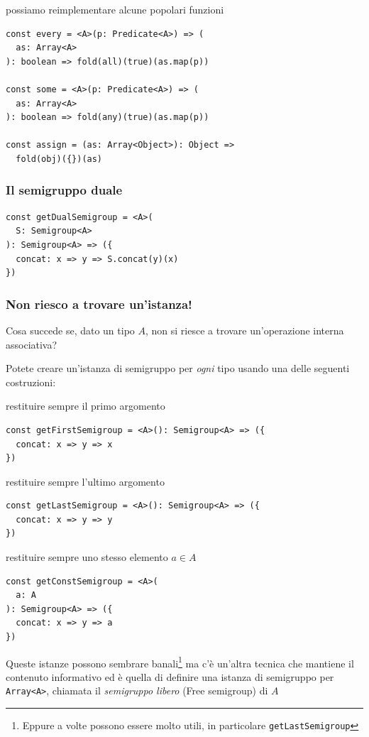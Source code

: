 \documentclass[12pt]{article}
\begin{document}
possiamo reimplementare alcune popolari funzioni

\begin{verbatim}
const every = <A>(p: Predicate<A>) => (
  as: Array<A>
): boolean => fold(all)(true)(as.map(p))

const some = <A>(p: Predicate<A>) => (
  as: Array<A>
): boolean => fold(any)(true)(as.map(p))

const assign = (as: Array<Object>): Object =>
  fold(obj)({})(as)
\end{verbatim}

\subsubsection{Il semigruppo duale}

\begin{verbatim}
const getDualSemigroup = <A>(
  S: Semigroup<A>
): Semigroup<A> => ({
  concat: x => y => S.concat(y)(x)
})
\end{verbatim}

\subsubsection{Non riesco a trovare un'istanza!}

Cosa succede se, dato un tipo $A$, non si riesce a trovare un'operazione interna associativa?

Potete creare un'istanza di semigruppo per \emph{ogni} tipo usando una delle seguenti costruzioni:

restituire sempre il primo argomento

\begin{verbatim}
const getFirstSemigroup = <A>(): Semigroup<A> => ({
  concat: x => y => x
})
\end{verbatim}

restituire sempre l'ultimo argomento

\begin{verbatim}
const getLastSemigroup = <A>(): Semigroup<A> => ({
  concat: x => y => y
})
\end{verbatim}

restituire sempre uno stesso elemento $a \in A$

\begin{verbatim}
const getConstSemigroup = <A>(
  a: A
): Semigroup<A> => ({
  concat: x => y => a
})
\end{verbatim}

Queste istanze possono sembrare banali\footnote{Eppure a volte possono essere molto utili, in particolare \texttt{getLastSemigroup}}
ma c'è un'altra tecnica che mantiene il contenuto informativo ed è quella di definire una istanza di semigruppo per \texttt{Array<A>},
chiamata il \emph{semigruppo libero} (Free semigroup) di $A$
\end{document}
